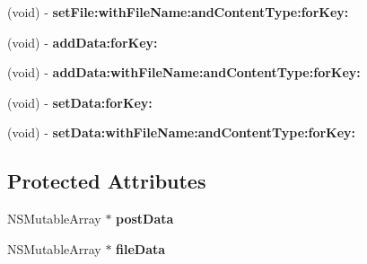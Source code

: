 \begin{DoxyCompactItemize}
\item 
\hypertarget{interface_a_s_i_form_data_request_a1b319de7b302e41e0f2b62b04efd4976}{
(void) -\/ {\bfseries set\-File\-:with\-File\-Name\-:and\-Content\-Type\-:for\-Key\-:}}
\label{interface_a_s_i_form_data_request_a1b319de7b302e41e0f2b62b04efd4976}

\item 
\hypertarget{interface_a_s_i_form_data_request_abeb27ef3dc358d5e0a27ba3a077a6653}{
(void) -\/ {\bfseries add\-Data\-:for\-Key\-:}}
\label{interface_a_s_i_form_data_request_abeb27ef3dc358d5e0a27ba3a077a6653}

\item 
\hypertarget{interface_a_s_i_form_data_request_a8ea88f81e036a80e7e7b7f9af04ac421}{
(void) -\/ {\bfseries add\-Data\-:with\-File\-Name\-:and\-Content\-Type\-:for\-Key\-:}}
\label{interface_a_s_i_form_data_request_a8ea88f81e036a80e7e7b7f9af04ac421}

\item 
\hypertarget{interface_a_s_i_form_data_request_a707a5cef615835146cdbed3ceca31016}{
(void) -\/ {\bfseries set\-Data\-:for\-Key\-:}}
\label{interface_a_s_i_form_data_request_a707a5cef615835146cdbed3ceca31016}

\item 
\hypertarget{interface_a_s_i_form_data_request_abbcca0f83bbe93f0132094a99a274098}{
(void) -\/ {\bfseries set\-Data\-:with\-File\-Name\-:and\-Content\-Type\-:for\-Key\-:}}
\label{interface_a_s_i_form_data_request_abbcca0f83bbe93f0132094a99a274098}

\end{DoxyCompactItemize}
\subsection*{\-Protected \-Attributes}
\begin{DoxyCompactItemize}
\item 
\hypertarget{interface_a_s_i_form_data_request_a592be5490f45f6c51c4d7ea1c9408a81}{
\-N\-S\-Mutable\-Array $\ast$ {\bfseries post\-Data}}
\label{interface_a_s_i_form_data_request_a592be5490f45f6c51c4d7ea1c9408a81}

\item 
\hypertarget{interface_a_s_i_form_data_request_a15916b1ef2392dc23a6d60a086be123e}{
\-N\-S\-Mutable\-Array $\ast$ {\bfseries file\-Data}}
\label{interface_a_s_i_form_data_request_a15916b1ef2392dc23a6d60a086be123e}

\end{DoxyCompactItemize}
